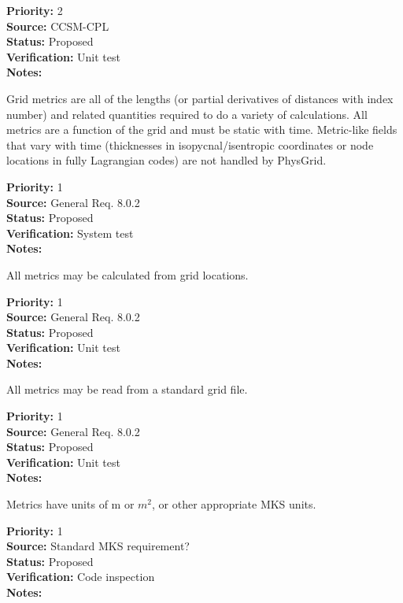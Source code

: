 \begin{reqlist}
{\bf Priority:} 2 \\
{\bf Source:} CCSM-CPL \\
{\bf Status:} Proposed \\
{\bf Verification:} Unit test \\
{\bf Notes:} 
\end{reqlist}

Grid metrics are all of the lengths (or partial derivatives of distances with
index number) and related quantities required to do a variety of calculations. 
All metrics are a function of the grid and must be static with time.  Metric-like
fields that vary with time (thicknesses in isopycnal/isentropic coordinates
or node locations in fully Lagrangian codes) are not handled by PhysGrid.
\begin{reqlist}
{\bf Priority:} 1 \\
{\bf Source:} General Req. 8.0.2 \\
{\bf Status:} Proposed \\
{\bf Verification:} System test\\
{\bf Notes:} 
\end{reqlist}

All metrics may be calculated from grid locations.
\begin{reqlist}
{\bf Priority:} 1 \\
{\bf Source:} General Req. 8.0.2 \\
{\bf Status:} Proposed \\
{\bf Verification:} Unit test\\
{\bf Notes:} 
\end{reqlist}

All metrics may be read from a standard grid file.
\begin{reqlist}
{\bf Priority:} 1 \\
{\bf Source:} General Req. 8.0.2 \\
{\bf Status:} Proposed \\
{\bf Verification:} Unit test\\
{\bf Notes:} 
\end{reqlist}

Metrics have units of m or $m^2$, or other appropriate MKS units.
\begin{reqlist}
{\bf Priority:} 1 \\
{\bf Source:} Standard MKS requirement? \\
{\bf Status:} Proposed \\
{\bf Verification:} Code inspection \\
{\bf Notes:} 
\end{reqlist}

